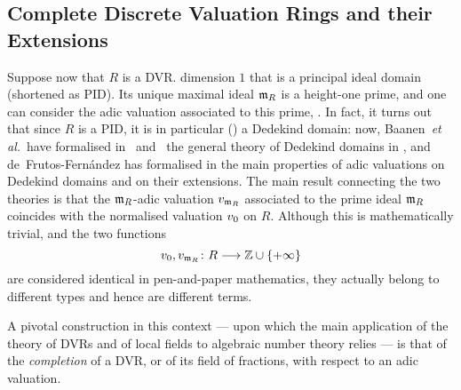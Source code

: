 \documentclass[sigplan,10pt,anonymous,review]{acmart}
\begin{document}
\subsection{Complete Discrete Valuation Rings and their Extensions}\label{subsec:complete_DVR}
Suppose now that $R$ is a DVR.  dimension $1$ that is a principal ideal domain (shortened as PID). Its unique maximal ideal $\mathfrak{m}_{R}$ is a height-one prime, and one can consider the adic valuation associated to this prime, . In fact, it turns out that since $R$ is a PID, it is in particular () a Dedekind domain: now, Baanen~\emph{et al.}~have formalised in~\cite{BaaDahNarNuc21} and~\cite{BaaDahNarNuc22} the general theory of Dedekind domains in \lean, and de~Frutos-Fernández  has formalised in \lean the main properties of adic valuations on Dedekind domains and on their extensions. The main result connecting the two theories is that the $\mathfrak{m}_{R}$-adic valuation $v_{\mathfrak{m}_{R}}$ associated to the prime ideal $\mathfrak{m}_{R}$ coincides with the normalised valuation ${v}_{0}$ on $R$. Although this is mathematically trivial, and the two functions
\[
{v}_{0},v_{\mathfrak{m}_{R}}\colon R\longrightarrow \mathbb{Z}\cup\{+\infty\}
\]
are considered identical in pen-and-paper mathematics, they actually belong to different types and hence are different terms.  

\vspace{3cm}

A pivotal construction in this context --- upon which the main application of the theory of DVRs and of local fields to algebraic number theory relies --- is that of the \emph{completion} of a DVR, or of its field of fractions, with respect to an adic valuation.
\end{document}

